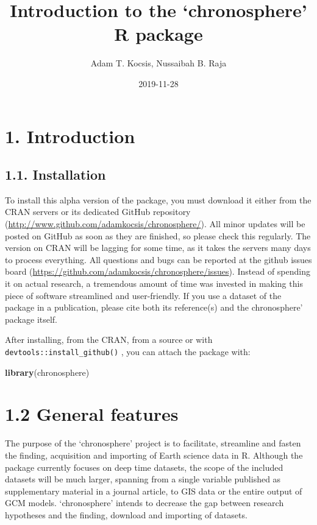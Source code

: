 \documentclass[]{article}
\title{Introduction to the `chronosphere' R package}
\author{Adam T. Kocsis, Nussaibah B. Raja}
\date{2019-11-28}
\newenvironment{Shaded}{\begin{snugshade}}{\end{snugshade}}
\newcommand{\KeywordTok}[1]{\textcolor[rgb]{0.13,0.29,0.53}{\textbf{#1}}}
\newcommand{\NormalTok}[1]{#1}
\begin{document}
\maketitle

\hypertarget{introduction}{%
\section{1. Introduction}\label{introduction}}

\hypertarget{installation}{%
\subsection{1.1. Installation}\label{installation}}

To install this alpha version of the package, you must download it
either from the CRAN servers or its dedicated GitHub repository
(\url{http://www.github.com/adamkocsis/chronosphere/}). All minor
updates will be posted on GitHub as soon as they are finished, so please
check this regularly. The version on CRAN will be lagging for some time,
as it takes the servers many days to process everything. All questions
and bugs can be reported at the github issues board
(\url{https://github.com/adamkocsis/chronosphere/issues}). Instead of
spending it on actual research, a tremendous amount of time was invested
in making this piece of software streamlined and user-friendly. If you
use a dataset of the package in a publication, please cite both its
reference(s) and the chronosphere' package itself.

After installing, from the CRAN, from a source or with
\texttt{devtools::install\_github()} , you can attach the package with:

\begin{Shaded}
\begin{Highlighting}[]
\KeywordTok{library}\NormalTok{(chronosphere)}
\end{Highlighting}
\end{Shaded}

\hypertarget{general-features}{%
\section{1.2 General features}\label{general-features}}

The purpose of the `chronosphere' project is to facilitate, streamline
and fasten the finding, acquisition and importing of Earth science data
in R. Although the package currently focuses on deep time datasets, the
scope of the included datasets will be much larger, spanning from a
single variable published as supplementary material in a journal
article, to GIS data or the entire output of GCM models. `chronosphere'
intends to decrease the gap between research hypotheses and the finding,
download and importing of datasets.
\end{document}
